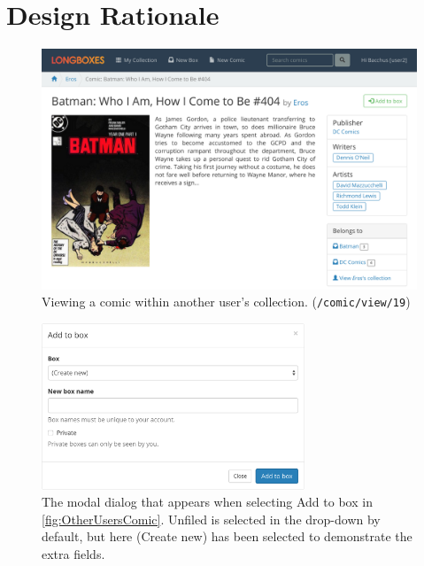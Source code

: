 \documentclass[fontsize=12pt,a4paper]{scrreprt}
\begin{document}
\chapter{Design Rationale}


\begin{figure}[h!]
  \centering
  \includegraphics[width=\textwidth]{other_users_comic.png}
  \caption{
    Viewing a comic within another user's collection.
    (\texttt{/comic/view/19})
  }
  \label{fig:OtherUsersComic}
\end{figure}

\begin{figure}[b!]
  \centering
  \includegraphics[width=0.7\textwidth]{add_to_box_modal.png}
  \caption{
    The modal dialog that appears when selecting \textsf{Add to box} in \autoref{fig:OtherUsersComic}.
    \textsf{Unfiled} is selected in the drop-down by default, but here \textsf{(Create new)} has been selected to demonstrate the extra fields.
  }
  \label{fig:AddToBoxModal}
\end{figure}
\end{document}
